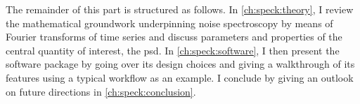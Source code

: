 The remainder of this part is structured as follows.
In \cref{ch:speck:theory}, I review the mathematical groundwork underpinning noise spectroscopy by means of Fourier transforms of time series and discuss parameters and properties of the central quantity of interest, the \gls{psd}.
In \cref{ch:speck:software}, I then present the software package by going over its design choices and giving a walkthrough of its features using a typical workflow as an example.
I conclude by giving an outlook on future directions in \cref{ch:speck:conclusion}.
